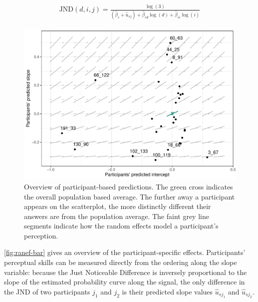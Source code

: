 \begin{eqnarray}
\label{eq:JND_random}
\text{JND}(d, i, j) = \frac{\log (3)}{(\hat{\beta}_s + \hat{u}_{sj}) + \hat{\beta}_{sd} \log(d) + \hat{\beta}_{si} \log(i) }
\end{eqnarray}


\begin{knitrout}
\color{fgcolor}\begin{figure}
\includegraphics[width=\maxwidth]{figure/ranef-bar-1} \caption[Overview of participant-based predictions]{Overview of participant-based predictions. The green cross indicates the overall population based average. The further away a participant appears on the scatterplot, the more distinctly different their answers are from the population average. The faint grey line segments indicate how the random effects model a participant's perception. }\label{fig:ranef-bar}
\end{figure}

\end{knitrout}

\autoref{fig:ranef-bar} gives an overview of the participant-specific effects. 
Participants' perceptual skills can be measured directly from the ordering along the slope variable: because the Just Noticeable Difference is inversely proportional to the slope of the estimated probability curve along the signal, the only difference in the JND of two participants $j_1$ and $j_2$ is their predicted slope values $\hat{u}_{sj_1}$ and $\hat{u}_{sj_2}$.

